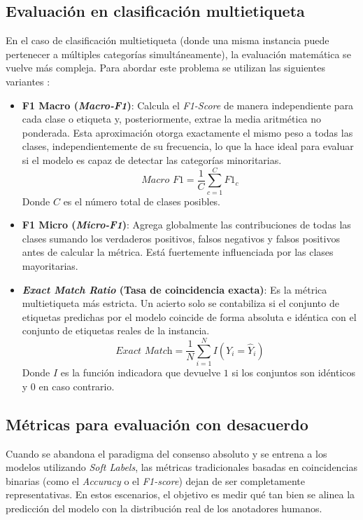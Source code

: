 \subsection{Evaluación en clasificación multietiqueta}
\label{subsec:EvaluacionEnClasificacionMultietiqueta}
En el caso de clasificación multietiqueta (donde una misma instancia puede pertenecer a múltiples categorías simultáneamente), la evaluación matemática se vuelve más compleja. Para abordar este problema se utilizan las siguientes variantes \cite{tsoumakas2007multi}: 
\begin{itemize}
    \item \textbf{F1 Macro (\textit{Macro-F1})}: Calcula el \textit{F1-Score} de manera independiente para cada clase o etiqueta y, posteriormente, extrae la media aritmética no ponderada. Esta aproximación otorga exactamente el mismo peso a todas las clases, independientemente de su frecuencia, lo que la hace ideal para evaluar si el modelo es capaz de detectar las categorías minoritarias. 
    \begin{equation}
        \textit{Macro F1} = \frac{1}{C} \sum_{c=1}^{C} \textit{F1}_c
    \label{eq:f1macro}
    \end{equation}
    Donde $C$ es el número total de clases posibles.  
    \item \textbf{F1 Micro (\textit{Micro-F1})}: Agrega globalmente las contribuciones de todas las clases sumando los verdaderos positivos, falsos negativos y falsos positivos antes de calcular la métrica. Está fuertemente influenciada por las clases mayoritarias. 
    \item \textbf{\textit{Exact Match Ratio} (Tasa de coincidencia exacta)}: Es la métrica multietiqueta más estricta. Un acierto solo se contabiliza si el conjunto de etiquetas predichas por el modelo coincide de forma absoluta e idéntica con el conjunto de etiquetas reales de la instancia.
    \begin{equation}
        \textit{Exact Match} = \frac{1}{N} \sum_{i=1}^{N} I(Y_i = \hat{Y}_i)    
    \label{eq:exactMatchRatio}
    \end{equation} 
    Donde $I$ es la función indicadora que devuelve $1$ si los conjuntos son idénticos y $0$ en caso contrario.  
\end{itemize}

\subsection{Métricas para evaluación con desacuerdo}
\label{subsec:MetricasParaEvaluacionConDesacuerdo}
Cuando se abandona el paradigma del consenso absoluto y se entrena a los modelos utilizando \textit{Soft Labels}, las métricas tradicionales basadas en coincidencias binarias (como el \textit{Accuracy} o el \textit{F1-score}) dejan de ser completamente representativas. En estos escenarios, el objetivo es medir qué tan bien se alinea la predicción del modelo con la distribución real de los anotadores humanos.


